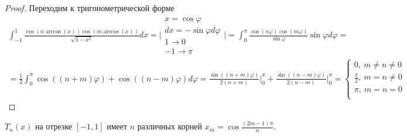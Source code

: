 \begin{proof}
  Переходим к тригонометрической форме
  \begin{multline*}
    \int_{-1}^{1}\frac{\cos(n\arccos(x))\cos(m\arccos(x))}{\sqrt{1-x^2}}dx
    =\Big|\substack{x=\cos\varphi \\
      dx = -\sin\varphi d\varphi\\
      1\rightarrow0 \\
      -1\rightarrow\pi
    }\Big|=\int_{0}^{\pi}\frac{\cos(n\varphi)\cos(m\varphi)}{\sin\varphi}\sin\varphi d\varphi = \\
    = \frac{1}{2}\int_0^{\pi}\cos((n+m)\varphi)+\cos((n-m)\varphi)d\varphi = \frac{\sin((n+m)\varphi)}{2(n+m)}\Big|_0^{\pi}+\frac{\sin((n-m)\varphi)}{2(n-m)}\Big|_0^{\pi}=\begin{cases}
      0,\ m\neq n\neq0         \\
      \frac{\pi}{2},\ m=n\neq0 \\
      \pi,\ m=n=0              \\
    \end{cases}
  \end{multline*}
\end{proof}


\def\SingleImageScale {1.3}

\begin{theorem}
  $T_n(x)$ на отрезке $[-1,1]$ имеет $n$ различных корней $x_m=\cos\frac{(2m-1)\pi}{n}$.
\end{theorem}

